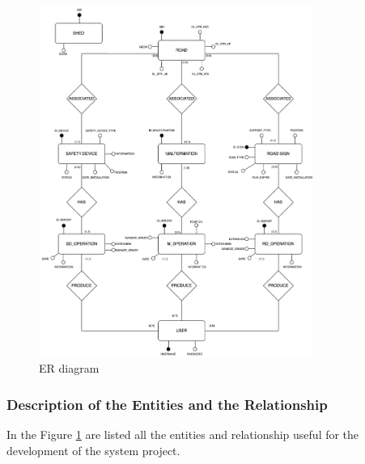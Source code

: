  \begin{figure}[h]
        \centering
        \includegraphics[width=0.8\textwidth]{images/ER.png}
        \caption{ER diagram}
        \label{ER}
 \end{figure}

 \newpage
 \subsubsection{Description of the Entities and the Relationship}
 In the Figure \ref{ER} are listed all the entities and relationship useful for the development of the system project.

